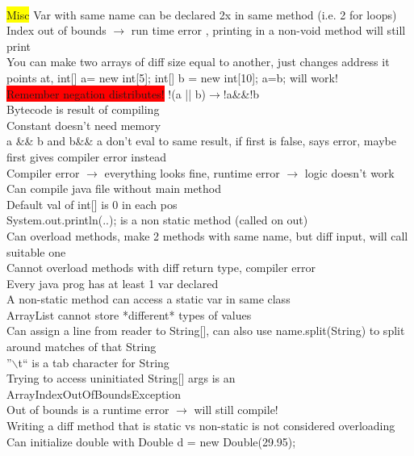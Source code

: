 ~\\ \color{Black}
\colorbox{Yellow}{Misc} Var with same name can be declared 2x in same method (i.e. 2 for loops)
\\ Index out of bounds $\rightarrow$ run time error , printing in a non-void method will still print
\\ You can make two arrays of diff size equal to another, just changes address it points at, int[] a= new int[5]; int[] b = new int[10]; a=b; will work!
\\ \colorbox{Red}{Remember negation distributes!} !(a || b)$\rightarrow$!a\&\&!b
\\ Bytecode is result of compiling
\\ Constant doesn't need memory
\\ a \&\& b and b\&\& a don't eval to same result, if first is false, says error, maybe first gives compiler error instead
\\ Compiler error $\rightarrow$ everything looks fine, runtime error $\rightarrow$ logic doesn't work
\\ Can compile java file without main method
\\ Default val of int[] is 0 in each pos
\\ System.out.println(..); is a non static method (called on out)
\\ Can overload methods, make 2 methods with same name, but diff input, will call suitable one
\\ Cannot overload methods with diff return type, compiler error
\\ Every java prog has at least 1 var declared
\\ A non-static method can access a static var in same class
\\ ArrayList cannot store *different* types of values
\\ Can assign a line from reader to String[], can also use name.split(String) to split around matches of that String
\\ ''$\backslash$t`` is a tab character for String
\\ Trying to access uninitiated String[] args is an ArrayIndexOutOfBoundsException
\\ Out of bounds is a runtime error $\rightarrow$ will still compile!
\\ Writing a diff method that is static vs non-static is not considered overloading
\\ Can initialize double with Double d = new Double(29.95);